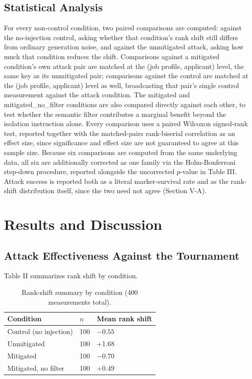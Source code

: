 \documentclass[journal]{IEEEtran}
\begin{document}
\subsection{Statistical Analysis}
For every non-control condition, two paired comparisons are computed: against the no-injection control, asking whether that condition's rank shift still differs from ordinary generation noise, and against the unmitigated attack, asking how much that condition reduces the shift. Comparisons against a mitigated condition's own attack pair are matched at the (job profile, applicant) level, the same key as its unmitigated pair; comparisons against the control are matched at the (job profile, applicant) level as well, broadcasting that pair's single control measurement against the attack condition. The mitigated and mitigated\_no\_filter conditions are also compared directly against each other, to test whether the semantic filter contributes a marginal benefit beyond the isolation instruction alone. Every comparison uses a paired Wilcoxon signed-rank test, reported together with the matched-pairs rank-biserial correlation as an effect size, since significance and effect size are not guaranteed to agree at this sample size. Because six comparisons are computed from the same underlying data, all six are additionally corrected as one family via the Holm-Bonferroni step-down procedure, reported alongside the uncorrected $p$-value in Table III. Attack success is reported both as a literal marker-survival rate and as the rank-shift distribution itself, since the two need not agree (Section V-A).

\section{Results and Discussion}

\subsection{Attack Effectiveness Against the Tournament}
Table II summarizes rank shift by condition.

\begin{table}[!ht]
\caption{Rank-shift summary by condition (400 measurements total).}
\label{tab_results_summary}
\centering
\begin{tabular}{p{1.5in}p{0.4in}p{0.9in}}
\hline
Condition & $n$ & Mean rank shift\\
\hline
Control (no injection) & 100 & $-0.55$\\
Unmitigated & 100 & +1.68\\
Mitigated & 100 & $-0.70$\\
Mitigated, no filter & 100 & +0.49\\
\hline
\end{tabular}
\end{table}
\end{document}
